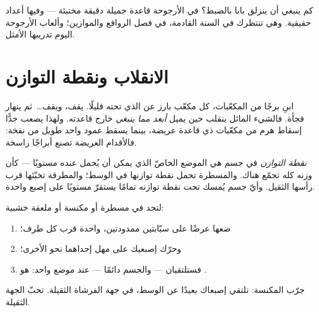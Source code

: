\begin{remark}[وعد]\label{rem:g2:balance-equilibrium:promise}
كم ينبغي أن ينزلق بابا بالضبط؟ في الأرجوحة قاعدة جميلة دقيقة
مختبئة --- وفيها أعداد حقيقية. وهي تنتظرك في السنة القادمة، في
فصل الروافع والموازين؛ وألعاب الأرجوحة اليوم تدريبها الأمثل.
\end{remark}

\section{الانقلاب ونقطة التوازن}

\begin{example}\label{ex:g2:balance-equilibrium:tower}
ابنِ برجًا من المكعّبات، كل مكعّب بارز عن الذي تحته قليلًا. يقف،
ويقف\dots\ ثم ينهار فجأة. فالشيء المائل ينقلب حين يميل \emph{أبعد
مما ينبغي} خارج قاعدته. ولهذا يصعب جدًّا إسقاط هرم من مكعّبات ذي
قاعدة عريضة، بينما يسقط عمود واحد طويل من نفخة: فالأقدام العريضة
تصنع أبراجًا راسخة.
\end{example}

\begin{definition}\label{def:g2:balance-equilibrium:point}
\emph{نقطة التوازن} في جسم هي الموضع الخاصّ
الذي يمكن أن يُحمل عنده مستويًا --- كأن وزنه كله تجمّع هناك.
والمسطرة تحمل نقطة توازنها في الوسط؛ والمطرقة تخبّئها قرب رأسها
الثقيل. وأيّ جسم يُمسك تحت نقطة توازنه تمامًا يستقرّ مستويًا على
إصبع واحدة.
\end{definition}

\begin{method}\label{met:g2:balance-equilibrium:find}
لتجد  في مسطرة أو مكنسة أو ملعقة خشبية:
\begin{enumerate}
  \item ضعها عرضًا على سبّابتين ممدودتين، واحدة قرب كل طرف؛
  \item وحرّك إصبعيك على مهل إحداهما نحو الأخرى؛
  \item فستلتقيان --- والجسم  دائمًا --- عند موضع واحد:
        هو .
\end{enumerate}
جرّب المكنسة: تلتقي إصبعاك بعيدًا عن الوسط، في جهة الفرشاة
الثقيلة.  تحبّ الجهة الثقيلة.
\end{method}

